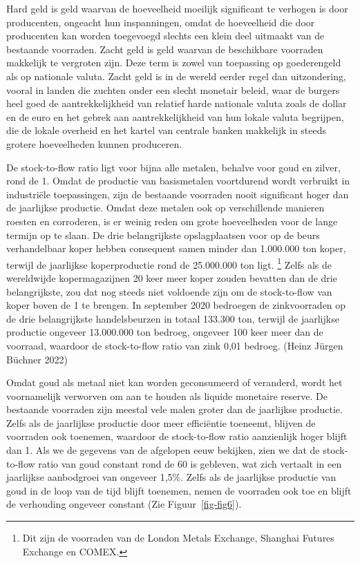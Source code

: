 \documentclass[
  a5paper,
  smalldemyvopaper,11pt,twoside,onecolumn,openright,extrafontsizes,
hidelinks]{memoir}
\begin{document}
Hard geld is geld waarvan de hoeveelheid moeilijk significant te
verhogen is door producenten, ongeacht hun inspanningen, omdat de
hoeveelheid die door producenten kan worden toegevoegd slechts een klein
deel uitmaakt van de bestaande voorraden. Zacht geld is geld waarvan de
beschikbare voorraden makkelijk te vergroten zijn. Deze term is zowel
van toepassing op goederengeld als op nationale valuta. Zacht geld is in
de wereld eerder regel dan uitzondering, vooral in landen die zuchten
onder een slecht monetair beleid, waar de burgers heel goed de
aantrekkelijkheid van relatief harde nationale valuta zoals de dollar en
de euro en het gebrek aan aantrekkelijkheid van hun lokale valuta
begrijpen, die de lokale overheid en het kartel van centrale banken
makkelijk in steeds grotere hoeveelheden kunnen produceren.

De stock-to-flow ratio ligt voor bijna alle metalen, behalve voor goud
en zilver, rond de 1. Omdat de productie van basismetalen voortdurend
wordt verbruikt in industriële toepassingen, zijn de bestaande voorraden
nooit significant hoger dan de jaarlijkse productie. Omdat deze metalen
ook op verschillende manieren roesten en corroderen, is er weinig reden
om grote hoeveelheden voor de lange termijn op te slaan. De drie
belangrijkste opslagplaatsen voor op de beurs verhandelbaar koper hebben
consequent samen minder dan 1.000.000 ton koper, terwijl de jaarlijkse
koperproductie rond de 25.000.000 ton ligt. \footnote{Dit zijn de
  voorraden van de London Metals Exchange, Shanghai Futures Exchange en
  COMEX.} Zelfs als de wereldwijde kopermagazijnen 20 keer meer koper
zouden bevatten dan de drie belangrijkste, zou dat nog steeds niet
voldoende zijn om de stock-to-flow van koper boven de 1 te brengen. In
september 2020 bedroegen de zinkvoorraden op de drie belangrijkste
handelsbeurzen in totaal 133.300 ton, terwijl de jaarlijkse productie
ongeveer 13.000.000 ton bedroeg, ongeveer 100 keer meer dan de voorraad,
waardoor de stock-to-flow ratio van zink 0,01 bedroeg. (Heinz Jürgen
Büchner 2022)

Omdat goud als metaal niet kan worden geconsumeerd of veranderd, wordt
het voornamelijk verworven om aan te houden als liquide monetaire
reserve. De bestaande voorraden zijn meestal vele malen groter dan de
jaarlijkse productie. Zelfs als de jaarlijkse productie door meer
efficiëntie toeneemt, blijven de voorraden ook toenemen, waardoor de
stock-to-flow ratio aanzienlijk hoger blijft dan 1. Als we de gegevens
van de afgelopen eeuw bekijken, zien we dat de stock-to-flow ratio van
goud constant rond de 60 is gebleven, wat zich vertaalt in een
jaarlijkse aanbodgroei van ongeveer 1,5\%. Zelfs als de jaarlijkse
productie van goud in de loop van de tijd blijft toenemen, nemen de
voorraden ook toe en blijft de verhouding ongeveer constant (Zie
Figuur~\ref{fig-fig6}).
\end{document}
